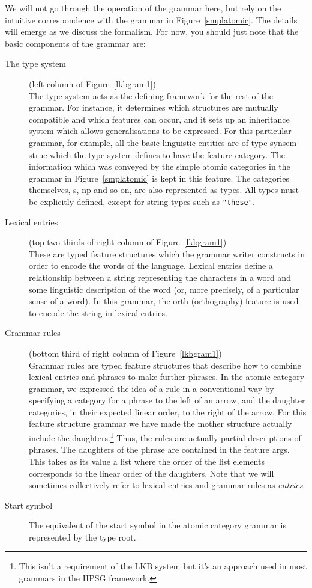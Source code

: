 \documentclass[12pt]{report}
\newcommand{\newterm}[1]{{\it #1}}
\begin{document}
We will not go through the operation
of the grammar here, but rely on the intuitive correspondence
with the grammar in Figure~\ref{smplatomic}.
The details will emerge as we discuss the
formalism.
For now, you should just note that 
the basic components of the grammar are:
\begin{description}
\item[The type system]  (left column of Figure~\ref{lkbgram1})\\
The type system acts as the defining
framework for the rest of the grammar.  For instance,
it determines which structures
are mutually compatible and which features can occur, and it sets
up an inheritance system which allows generalisations to be 
expressed.  For this particular grammar, for example,
all the basic linguistic entities
are of type {\type synsem-struc} which the type system defines
to have the feature {\feature category}.
The information which was conveyed by the simple atomic categories
in the grammar in Figure~\ref{smplatomic}
is kept in this feature.
The categories themselves, {\type s}, {\type np} and so
on, are also represented as types. 
All types must be explicitly defined, except for
string types such as {\tt "these"}.
\item[Lexical entries]  (top two-thirds of 
right column of Figure~\ref{lkbgram1})\\
These are typed feature structures
which the grammar writer constructs in order to encode the words
of the language.  Lexical entries define a relationship 
between a string representing the characters in a word
and some linguistic description of the word (or, more precisely,
of a particular sense of a word).
In this grammar,
the {\feature orth} (orthography)
feature is used to encode the string in lexical 
entries.  
\item[Grammar rules] (bottom third of 
right column of Figure~\ref{lkbgram1})\\
Grammar rules are typed feature structures that
describe how to combine lexical entries and phrases
to make further phrases.  In the atomic category grammar, we expressed 
the idea of a rule in a conventional way by specifying 
a category for a phrase
to the left of an arrow, and the daughter categories, in their
expected linear order, to the right of the arrow.
For this feature structure grammar
we have made the mother structure actually
include the daughters.\footnote{This isn't a requirement of the LKB system
but it's an approach used in most grammars in the HPSG framework.}  
Thus, the rules are actually partial descriptions
of phrases.  The daughters of the phrase are
contained in the feature {\feature args}.  This takes as its value a list
where the order of the list elements
corresponds
to the linear order of the daughters.  
Note that we will sometimes collectively refer to lexical entries
and grammar rules as \newterm{entries}.
\item[Start symbol]
The equivalent of the
start symbol in the atomic category grammar
is represented by the type {\type root}.
\end{description}
\end{document}
